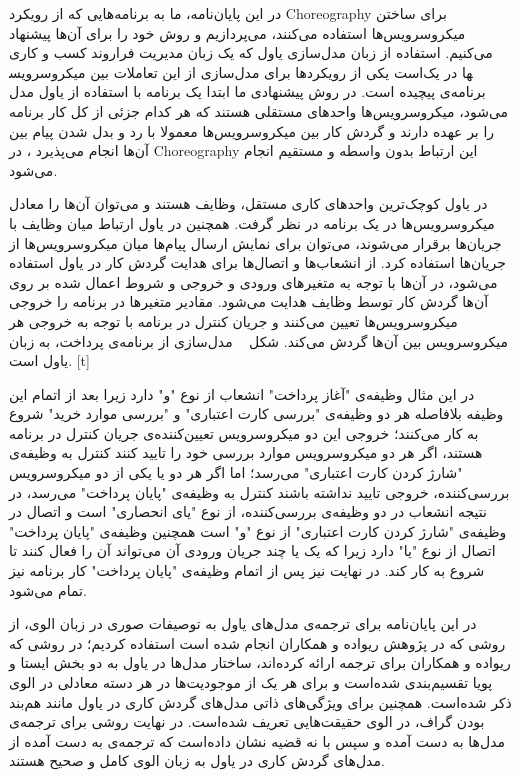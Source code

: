 در این پایان‌نامه، ما به برنامه‌هایی که از رویکرد Choreography برای ساختن میکروسرویس‌ها استفاده می‌کنند، می‌پردازیم و روش خود را برای آن‌ها پیشنهاد می‌کنیم. 
استفاده از زبان‌ مدل‌سازی یاول که یک زبان مدیریت فراروند کسب و کاری است یکی از رویکردها برای مدل‌سازی از این تعاملات بین میکروسرویس‎ها در یک برنامه‌ی پیچیده است.
در روش پیشنهادی ما ابتدا یک برنامه با استفاده از یاول مدل می‌شود، میکروسرویس‌ها واحد‌های مستقلی هستند که هر کدام جزئی از کل کار برنامه را بر عهده دارند و گردش کار بین میکروسرویس‌ها معمولا با رد و بدل شدن پیام بین آن‌ها انجام می‌پذیرد ،
 در Choreography این ارتباط بدون واسطه و مستقیم انجام می‌شود. 
 
 
 در یاول کوچک‌ترین واحدهای کاری مستقل، وظایف هستند و می‌توان آن‌ها را معادل میکروسرویس‌ها در یک برنامه در نظر گرفت. 
 همچنین در یاول ارتباط میان وظایف با جریان‌ها برقرار می‌شوند،  می‌توان برای نمایش ارسال پیام‌ها میان میکروسرویس‌ها از جریان‌ها استفاده کرد. 
 از انشعاب‌ها و اتصال‌ها برای هدایت گردش کار در یاول استفاده می‌شود، در آن‌ها با توجه به متغیر‌های ورودی و خروجی و شروط اعمال شده بر روی آن‌ها گردش کار توسط وظایف هدایت می‌شود. 
 مقادیر متغیرها در برنامه را خروجی میکروسرویس‌ها تعیین می‌کنند و جریان کنترل در برنامه با توجه به خروجی هر میکروسرویس بین آن‌ها گردش می‌کند. شکل ~ مدل‌سازی از برنامه‌ی پرداخت، به زبان یاول است.
[t]
\vspace{0.5em}

در این مثال وظیفه‌ی "آغاز پرداخت" انشعاب از نوع "و" دارد زیرا بعد از اتمام این وظیفه بلافاصله هر دو وظیفه‌ی "بررسی کارت اعتباری" و "بررسی موارد خرید" شروع به کار می‌کنند؛ 
خروجی این دو میکروسرویس تعیین‌کننده‌ی جریان کنترل در برنامه هستند، اگر هر دو میکروسرویس‌ موارد بررسی خود را تایید کنند کنترل به وظیفه‌ی "شارژ کردن کارت اعتباری" می‌رسد؛
 اما اگر هر دو یا یکی از دو میکروسرویس بررسی‌کننده، خروجی تایید نداشته باشند کنترل به وظیفه‌ی "پایان پرداخت" می‌رسد، در نتیجه انشعاب در دو وظیفه‌ی بررسی‌کننده، از نوع "یای انحصاری" است و اتصال در وظیفه‌ی "شارژ کردن کارت اعتباری" از نوع "و" است همچنین وظیفه‌ی "پایان پرداخت" اتصال از نوع "یا" دارد زیرا که یک یا چند جریان ورودی آن می‌تواند آن را فعال کنند تا شروع به کار کند.
  در نهایت نیز پس از اتمام وظیفه‌ی "پایان پرداخت" کار برنامه نیز تمام می‌شود. 
  
  
  
در این پایان‌نامه برای ترجمه‌ی مدل‌های یاول به توصیفات صوری در زبان الوی، از روشی که در پژوهش ریواده و همکاران انجام شده است استفاده کردیم؛
 در روشی که ریواده و همکاران برای ترجمه ارائه کرده‌اند، ساختار مدل‌ها در یاول به دو بخش ایستا و پویا تقسیم‌بندی شده‌است و برای هر یک از موجودیت‌ها در هر دسته معادلی در الوی ذکر شده‌است. 
 همچنین برای ویژگی‌های ذاتی مدل‌های گردش کاری در یاول مانند هم‌بند بودن گراف، در الوی حقیقت‌هایی تعریف شده‌است.
  در نهایت روشی برای ترجمه‌ی مدل‌ها به دست آمده و سپس با نه قضیه نشان داده‌است که ترجمه‌ی به دست آمده از مدل‌های گردش کاری در یاول به زبان الوی کامل و صحیح هستند.
  
